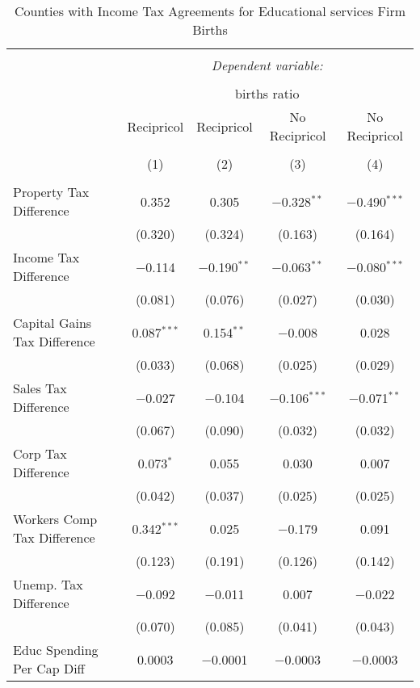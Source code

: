 
\begin{table}[!htbp] \centering 
  \caption{Counties with Income Tax Agreements for  Educational services Firm Births} 
  \label{61agreement} 
\begin{tabular}{@{\extracolsep{5pt}}lcccc} 
\\[-1.8ex]\hline 
\hline \\[-1.8ex] 
 & \multicolumn{4}{c}{\textit{Dependent variable:}} \\ 
\cline{2-5} 
\\[-1.8ex] & \multicolumn{4}{c}{births ratio} \\ 
 & Recipricol & Recipricol & No Recipricol & No Recipricol \\ 
\\[-1.8ex] & (1) & (2) & (3) & (4)\\ 
\hline \\[-1.8ex] 
 Property Tax Difference & 0.352 & 0.305 & $-$0.328$^{**}$ & $-$0.490$^{***}$ \\ 
  & (0.320) & (0.324) & (0.163) & (0.164) \\ 
  Income Tax Difference & $-$0.114 & $-$0.190$^{**}$ & $-$0.063$^{**}$ & $-$0.080$^{***}$ \\ 
  & (0.081) & (0.076) & (0.027) & (0.030) \\ 
  Capital Gains Tax Difference & 0.087$^{***}$ & 0.154$^{**}$ & $-$0.008 & 0.028 \\ 
  & (0.033) & (0.068) & (0.025) & (0.029) \\ 
  Sales Tax Difference & $-$0.027 & $-$0.104 & $-$0.106$^{***}$ & $-$0.071$^{**}$ \\ 
  & (0.067) & (0.090) & (0.032) & (0.032) \\ 
  Corp Tax Difference & 0.073$^{*}$ & 0.055 & 0.030 & 0.007 \\ 
  & (0.042) & (0.037) & (0.025) & (0.025) \\ 
  Workers Comp Tax Difference & 0.342$^{***}$ & 0.025 & $-$0.179 & 0.091 \\ 
  & (0.123) & (0.191) & (0.126) & (0.142) \\ 
  Unemp. Tax Difference & $-$0.092 & $-$0.011 & 0.007 & $-$0.022 \\ 
  & (0.070) & (0.085) & (0.041) & (0.043) \\ 
  Educ Spending Per Cap Diff & 0.0003 & $-$0.0001 & $-$0.0003 & $-$0.0003 \\ 

\end{tabular}
\end{table}
